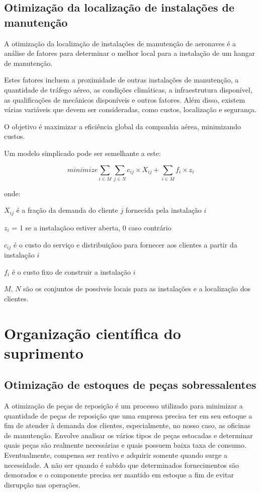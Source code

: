 \documentclass{amsart}
\begin{document}
\subsection{Otimização da localização de instalações de manutenção}

A otimização da localização de instalações de manutenção de aeronaves é a análise de fatores para determinar o melhor local para a instalação de um hangar de manutenção.

Estes fatores incluem a proximidade de outras instalações de manutenção, a quantidade de tráfego aéreo, as condições climáticas, a infraestrutura disponível, as qualificações de mecânicos disponíveis e outros fatores. Além disso, existem várias variáveis que devem ser consideradas, como custos, localização e segurança.

O objetivo é maximizar a eficiência global da companhia aérea, minimizando custos.

Um modelo simplicado pode ser semelhante a este:


\begin{equation} \label{eq:fo3}
minimize \sum_{i \in M} \sum_{j \in N} c_{ij} \times X_{ij} + \sum_{i \in M} f_i \times z_i
\end{equation}

onde:

$X_{ij}$ é a fração da demanda do cliente $j$ fornecida pela instalação $i$

$z_i$ = 1 se a instalaçãoo estiver aberta, 0 caso contrário

$c_{ij}$ é o custo do serviço e distribuiçãoo para fornecer aos clientes a partir da instalação $i$

$f_i$ é o custo fixo de construir a instalação $i$

$M$, $N$ são os conjuntos de possíveis locais para as instalações e a localização dos clientes.


\section{Organização científica do suprimento}


\subsection{Otimização de estoques de peças sobressalentes}

A otimização de peças de reposição é um processo utilizado para minimizar a quantidade de peças de reposição que uma empresa precisa ter em seu estoque a fim de atender à demanda dos clientes, especialmente, no nosso caso, as oficinas de manutenção. Envolve analisar os vários tipos de peças estocadas e determinar quais peças são realmente necessárias e quais possuem baixa taxa de consumo. Eventualmente, compensa ser reativo e adquirir somente quando surge a necessidade. A não ser quando é sabido que determinados fornecimentos são demorados e o componente precisa ser mantido em estoque a fim de evitar disrupção nas operações.
\end{document}
